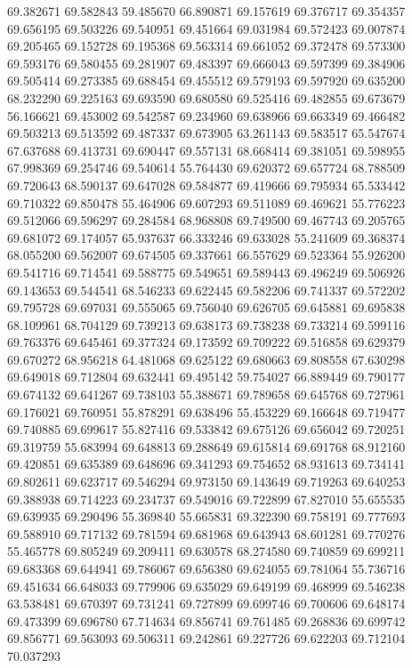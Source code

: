 69.382671
69.582843
59.485670
66.890871
69.157619
69.376717
69.354357
69.656195
69.503226
69.540951
69.451664
69.031984
69.572423
69.007874
69.205465
69.152728
69.195368
69.563314
69.661052
69.372478
69.573300
69.593176
69.580455
69.281907
69.483397
69.666043
69.597399
69.384906
69.505414
69.273385
69.688454
69.455512
69.579193
69.597920
69.635200
68.232290
69.225163
69.693590
69.680580
69.525416
69.482855
69.673679
56.166621
69.453002
69.542587
69.234960
69.638966
69.663349
69.466482
69.503213
69.513592
69.487337
69.673905
63.261143
69.583517
65.547674
67.637688
69.413731
69.690447
69.557131
68.668414
69.381051
69.598955
67.998369
69.254746
69.540614
55.764430
69.620372
69.657724
68.788509
69.720643
68.590137
69.647028
69.584877
69.419666
69.795934
65.533442
69.710322
69.850478
55.464906
69.607293
69.511089
69.469621
55.776223
69.512066
69.596297
69.284584
68.968808
69.749500
69.467743
69.205765
69.681072
69.174057
65.937637
66.333246
69.633028
55.241609
69.368374
68.055200
69.562007
69.674505
69.337661
66.557629
69.523364
55.926200
69.541716
69.714541
69.588775
69.549651
69.589443
69.496249
69.506926
69.143653
69.544541
68.546233
69.622445
69.582206
69.741337
69.572202
69.795728
69.697031
69.555065
69.756040
69.626705
69.645881
69.695838
68.109961
68.704129
69.739213
69.638173
69.738238
69.733214
69.599116
69.763376
69.645461
69.377324
69.173592
69.709222
69.516858
69.629379
69.670272
68.956218
64.481068
69.625122
69.680663
69.808558
67.630298
69.649018
69.712804
69.632441
69.495142
59.754027
66.889449
69.790177
69.674132
69.641267
69.738103
55.388671
69.789658
69.645768
69.727961
69.176021
69.760951
55.878291
69.638496
55.453229
69.166648
69.719477
69.740885
69.699617
55.827416
69.533842
69.675126
69.656042
69.720251
69.319759
55.683994
69.648813
69.288649
69.615814
69.691768
68.912160
69.420851
69.635389
69.648696
69.341293
69.754652
68.931613
69.734141
69.802611
69.623717
69.546294
69.973150
69.143649
69.719263
69.640253
69.388938
69.714223
69.234737
69.549016
69.722899
67.827010
55.655535
69.639935
69.290496
55.369840
55.665831
69.322390
69.758191
69.777693
69.588910
69.717132
69.781594
69.681968
69.643943
68.601281
69.770276
55.465778
69.805249
69.209411
69.630578
68.274580
69.740859
69.699211
69.683368
69.644941
69.786067
69.656380
69.624055
69.781064
55.736716
69.451634
66.648033
69.779906
69.635029
69.649199
69.468999
69.546238
63.538481
69.670397
69.731241
69.727899
69.699746
69.700606
69.648174
69.473399
69.696780
67.714634
69.856741
69.761485
69.268836
69.699742
69.856771
69.563093
69.506311
69.242861
69.227726
69.622203
69.712104
70.037293
